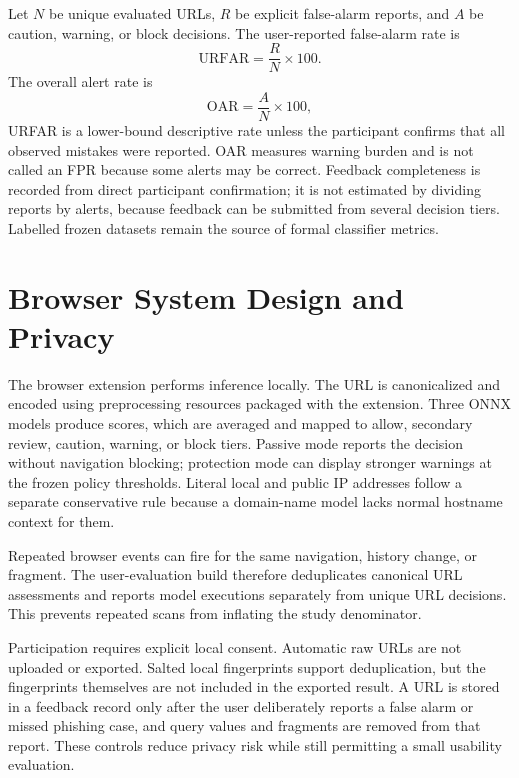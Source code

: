 Let $N$ be unique evaluated URLs, $R$ be explicit false-alarm reports, and $A$
be caution, warning, or block decisions. The user-reported false-alarm rate is
\begin{equation}
    \mathrm{URFAR}=\frac{R}{N}\times100.
    \label{eq:method-urfar}
\end{equation}
The overall alert rate is
\begin{equation}
    \mathrm{OAR}=\frac{A}{N}\times100,
    \label{eq:method-oar}
\end{equation}
URFAR is a lower-bound descriptive rate unless the participant confirms that
all observed mistakes were reported. OAR measures warning burden and is not
called an FPR because some alerts may be correct. Feedback completeness is
recorded from direct participant confirmation; it is not estimated by dividing
reports by alerts, because feedback can be submitted from several decision
tiers. Labelled frozen datasets remain the source of formal classifier metrics.

\section{Browser System Design and Privacy}

The browser extension performs inference locally. The URL is canonicalized and
encoded using preprocessing resources packaged with the extension. Three ONNX
models produce scores, which are averaged and mapped to allow, secondary
review, caution, warning, or block tiers. Passive mode reports the decision
without navigation blocking; protection mode can display stronger warnings at
the frozen policy thresholds. Literal local and public IP addresses follow a
separate conservative rule because a domain-name model lacks normal hostname
context for them.

Repeated browser events can fire for the same navigation, history change, or
fragment. The user-evaluation build therefore deduplicates canonical URL
assessments and reports model executions separately from unique URL decisions.
This prevents repeated scans from inflating the study denominator.

Participation requires explicit local consent. Automatic raw URLs are not
uploaded or exported. Salted local fingerprints support deduplication, but the
fingerprints themselves are not included in the exported result. A URL is
stored in a feedback record only after the user deliberately reports a false
alarm or missed phishing case, and query values and fragments are removed from
that report. These controls reduce privacy risk while still permitting a small
usability evaluation.

